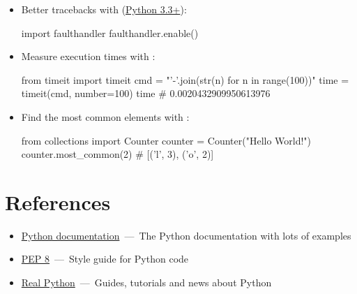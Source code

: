 \documentclass[rules]{cheatsheet}
\begin{document}
\begin{itemize}
  \item Better tracebacks with \href{https://docs.python.org/3/library/faulthandler.html}{} (\href{https://docs.python.org/3/whatsnew/3.3.html}{Python 3.3+}):
  \begin{python}[gobble=4]
    import faulthandler
    faulthandler.enable()
  \end{python}

  \item Measure execution times with \href{https://docs.python.org/3/library/timeit.html#timeit.timeit}{}:
  \begin{python}[gobble=4]
    from timeit import timeit
    cmd = "'-'.join(str(n) for n in range(100))"
    time = timeit(cmd, number=100)
    time # 0.0020432909950613976
  \end{python}

  \item Find the most common elements with \href{https://docs.python.org/3/library/collections.html#collections.Counter}{}:
  \begin{python}[gobble=4]
    from collections import Counter
    counter = Counter("Hello World!")
    counter.most_common(2) # [('l', 3), ('o', 2)]
  \end{python}
\end{itemize}

\section{References}

\begin{itemize}
  \item \href{https://docs.python.org/3/index.html}%
    {Python documentation}~---~The Python documentation with lots of examples
  \item \href{https://www.python.org/dev/peps/pep-0008/}%
    {PEP 8}~---~Style guide for Python code
  \item \href{https://realpython.com/}%
    {Real Python}~---~Guides, tutorials and news about Python
\end{itemize}
\end{document}
